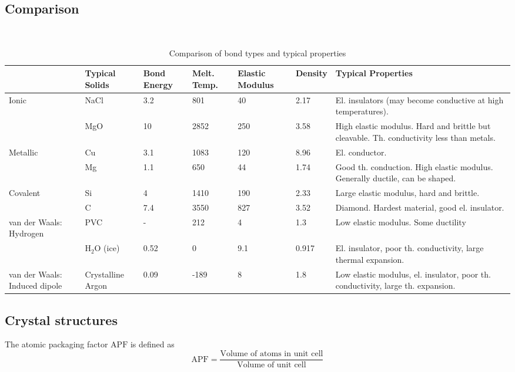 \subsection{Comparison} ~\\
\begin{table}[ht]
    \begin{tabularx}{\linewidth}{p{2cm}p{1.5cm}p{1.4cm}p{1.4cm}p{1.5cm}lX}
    	& Typical Solids & Bond Energy  & Melt. Temp. & Elastic Modulus & Density & Typical Properties \\ \toprule
    	Ionic & NaCl & 3.2 & 801 & 40 & 2.17 & El. insulators (may become conductive at high temperatures). \\
    	 & MgO & 10 & 2852 & 250 & 3.58 & High elastic modulus. Hard and brittle but cleavable. Th. conductivity less than metals.\\
    	Metallic & Cu & 3.1 & 1083 & 120 & 8.96 & El. conductor. \\
    	 & Mg & 1.1 & 650 & 44 & 1.74 & Good th. conduction. High elastic modulus. Generally ductile, can be shaped. \\
    	Covalent & Si & 4 & 1410 & 190 & 2.33 & Large elastic modulus, hard and brittle. \\
    	  & C & 7.4 & 3550 & 827 & 3.52 & Diamond. Hardest material, good el. insulator. \\
    	van der Waals: Hydrogen & PVC & - & 212 & 4 & 1.3 & Low elastic modulus. Some ductility \\
    	 & H$_2$O (ice) & 0.52 & 0 & 9.1 & 0.917 & El. insulator, poor th. conductivity, large thermal expansion. \\
        van der Waals: Induced dipole & Crystalline Argon & 0.09 & -189 & 8 & 1.8 & Low elastic modulus, el. insulator, poor th. conductivity, large th. expansion. \\
    	\bottomrule
    \end{tabularx}
    \caption{Comparison of bond types and typical properties}
\end{table}

\subsection{Crystal structures}

The atomic packaging factor $\mathrm{APF}$ is defined as
\begin{equation}
    \mathrm{APF} = \frac{\text{Volume of atoms in unit cell}}{\text{Volume of unit cell}}
\end{equation}

